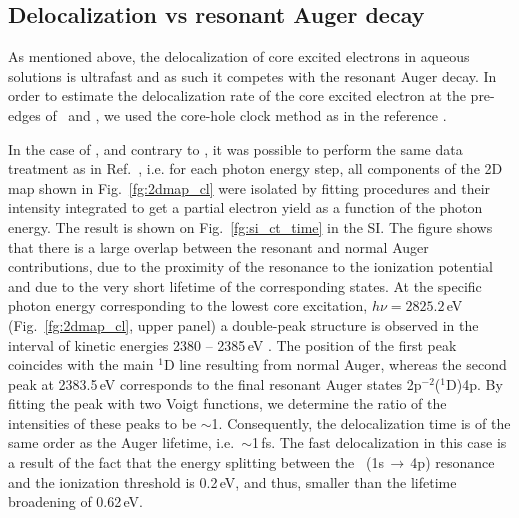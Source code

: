
\subsection{Delocalization vs resonant Auger decay}

As mentioned above, the delocalization of core excited electrons in aqueous solutions is ultrafast and as such it competes with the resonant Auger decay. In order to estimate the delocalization rate of the core excited electron at the pre-edges of \ki~and \cli, we used the core-hole clock method as in the reference  \cite{bjorneholm92:1892,karis96:1380}.

In the case of \cli, and contrary to \ki, it was possible to perform the same data treatment as in Ref.\ \cite{ceolin15:022502}, %
i.e. for each photon energy step, all components of the 2D map shown in Fig.\ \ref{fg:2dmap_cl} were isolated by fitting procedures and their intensity integrated to get a partial electron yield as a function of the photon energy. The result is shown on Fig.\ \ref{fg:si_ct_time} in the SI. The figure shows that there is a large overlap between the resonant and normal Auger contributions, due to the proximity of the resonance to the ionization potential and due to the very short lifetime of the corresponding states. At the specific photon energy corresponding to the lowest core excitation, $h\nu = 2825.2$\,eV (Fig.\ \ref{fg:2dmap_cl}, upper panel) a double-peak structure is observed in the interval of kinetic energies 2380 -- 2385\,eV . The position of the first peak coincides with the main $^1$D line resulting from normal Auger, whereas the second peak at 2383.5\,eV corresponds to the final resonant Auger states 2p$^{-2}$($^1$D)4p. By fitting the peak with two Voigt functions, we determine the ratio of the intensities of these peaks to be $\sim$1. Consequently, the delocalization time is of the same order as the Auger lifetime, i.e.\ $\sim$1\,fs. The fast delocalization in this case is a result of the fact that the energy splitting between the \cli~(1s$\,\rightarrow\,$4p) resonance and the ionization threshold is 0.2\,eV, and thus, smaller than the lifetime broadening of 0.62\,eV.

